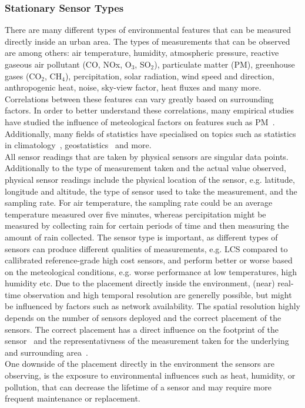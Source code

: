 \subsubsection{Stationary Sensor Types}
There are many different types of environmental features that can be measured directly inside an urban area. The types of measurements that can be observed are among others: air temperature, humidity, atmospheric pressure, reactive gaseous air pollutant (CO, NOx, O$_3$, SO$_2$), particulate matter (PM), greenhouse gases (CO$_2$, CH$_4$), percipitation, solar radiation, wind speed and direction, anthropogenic heat, noise, sky-view factor, heat fluxes and many more. %
Correlations between these features can vary greatly based on surrounding factors. In order to better understand these correlations, many empirical studies have studied the influence of meteological factors on features such as PM~\cite{tai2010correlations}. Additionally, many fields of statistics have specialised on topics such as statistics in climatology~\cite{von2002statistical}, geostatistics~\cite{trangmar1986application} and more.\\
All sensor readings that are taken by physical sensors are singular data points. Additionally to the type of measurement taken and the actual value observed, physical sensor readings include the physical location of the sensor, e.g. latitude, longitude and altitude, the type of sensor used to take the measurement, and the sampling rate. For air temperature, the sampling rate could be an average temperature measured over five minutes, whereas percipitation might be measured by collecting rain for certain periods of time and then measuring the amount of rain collected. The sensor type is important, as different types of sensors can produce different qualities of measurements, e.g. LCS compared to callibrated reference-grade high cost sensors, and perform better or worse based on the meteological conditions, e.g. worse performance at low temperatures, high humidity etc. Due to the placement directly inside the environment, (near) real-time observation and high temporal resolution are generelly possible, but might be influenced by factors such as network availability. The spatial resolution highly depends on the number of sensors deployed and the correct placement of the sensors. The correct placement has a direct influence on the footprint of the sensor~\cite{leclerc2014footprints} and the representativness of the measurement taken for the underlying and surrounding area~\cite{oke2006guideline}.\\
One downside of the placement directly in the environment the sensors are observing, is the exposure to environmental influences such as heat, humidity, or pollution, that can decrease the lifetime of a sensor and may require more frequent maintenance or replacement.

